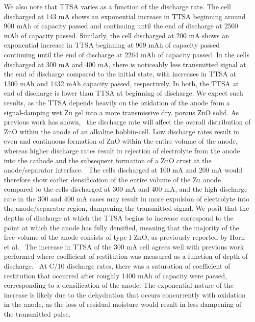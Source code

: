 We also note that TTSA varies as a function of the discharge rate. The cell discharged at 143 mA shows an exponential increase in TTSA beginning around 900 mAh of capacity passed and continuing until the end of discharge at 2500 mAh of capacity passed. Similarly, the cell discharged at 200 mA shows an exponential increase in TTSA beginning at 969 mAh of capacity passed continuing until the end of discharge at 2264 mAh of capacity passed. In the cells discharged at 300 mA and 400 mA, there is noticeably less transmitted signal at the end of discharge compared to the initial state, with increases in TTSA at 1300 mAh and 1432 mAh capacity passed, respectively. In both, the TTSA at end of discharge is lower than TTSA at beginning of discharge. We expect such results, as the TTSA depends heavily on the oxidation of the anode from a signal-damping wet Zn gel into a more transmissive dry, porous ZnO solid. As previous work has shown,~\cite{Bhadra2015-aq,haibel,Manke2007-yj} the discharge rate will affect the overall distribution of ZnO within the anode of an alkaline bobbin-cell. Low discharge rates result in even and continuous formation of ZnO within the entire volume of the anode, whereas higher discharge rates result in rejection of electrolyte from the anode into the cathode and the subsequent formation of a ZnO crust at the anode/separator interface.~\cite{Riley2010-ur} The cells discharged at 100 mA and 200 mA would therefore show earlier densification of the entire volume of the Zn anode compared to the cells discharged at 300 mA and 400 mA, and the high discharge rate in the 300 and 400 mA cases may result in more expulsion of electrolyte into the anode/separator region, dampening the transmitted signal. We posit that the depths of discharge at which the TTSA begins to increase correspond to the point at which the anode has fully densified, meaning that the majority of the free volume of the anode consists of type I ZnO, as previously reported by Horn et al.~\cite{horn} The increase in TTSA of the 300 mA cell agrees well with previous work performed where coefficient of restitution was measured as a function of depth of discharge.~\cite{Bhadra2015-aq} At C/10 discharge rates, there was a saturation of coefficient of restitution  that occurred after roughly 1400 mAh of capacity were passed, corresponding to a densification of the anode. The exponential nature of the increase is likely due to the dehydration that occurs concurrently with oxidation in the anode, as the loss of residual moisture would result in less dampening of the transmitted pulse.

